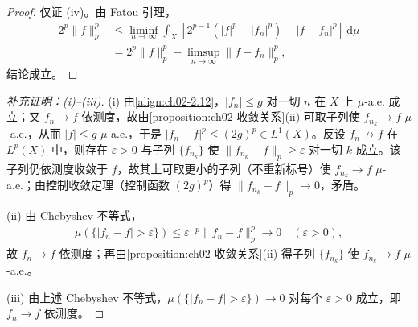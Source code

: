 \documentclass[../../main.tex]{subfiles}%
\begin{document}
\begin{proof}
仅证 (iv)。由 Fatou 引理，
\begin{align*}
2^p\|f\|_p^p&\leqslant\liminf_{n\to\infty}\int_X[2^{p-1}(|f|^p+|f_n|^p)-|f-f_n|^p]\,\mathrm{d}\mu\\
&=2^p\|f\|_p^p-\limsup_{n\to\infty}\|f-f_n\|_p^p,
\end{align*}
结论成立。
\end{proof}

\begin{proof}[补充证明：(i)--(iii)]
(i) 由\eqref{align:ch02-2.12}，$|f_n|\leqslant g$ 对一切 $n$ 在 $X$ 上 $\mu$-a.e. 成立；又 $f_n\to f$ 依测度，故由\cref{proposition:ch02-收敛关系}(ii) 可取子列使 $f_{n_k}\to f$ $\mu$-a.e.，从而 $|f|\leqslant g$ $\mu$-a.e.，于是 $|f_n-f|^p\leqslant(2g)^p\in L^1(X)$。反设 $f_n\not\to f$ 在 $L^p(X)$ 中，则存在 $\varepsilon>0$ 与子列 $\{f_{n_k}\}$ 使 $\|f_{n_k}-f\|_p\geqslant\varepsilon$ 对一切 $k$ 成立。该子列仍依测度收敛于 $f$，故其上可取更小的子列（不重新标号）使 $f_{n_k}\to f$ $\mu$-a.e.；由控制收敛定理（控制函数 $(2g)^p$）得 $\|f_{n_k}-f\|_p\to0$，矛盾。

(ii) 由 Chebyshev 不等式，
\begin{align*}
\mu(\{|f_n-f|>\varepsilon\})\leqslant\varepsilon^{-p}\|f_n-f\|_p^p\to0\quad(\varepsilon>0),
\end{align*}
故 $f_n\to f$ 依测度；再由\cref{proposition:ch02-收敛关系}(ii) 得子列 $\{f_{n_k}\}$ 使 $f_{n_k}\to f$ $\mu$-a.e.。

(iii) 由上述 Chebyshev 不等式，$\mu(\{|f_n-f|>\varepsilon\})\to0$ 对每个 $\varepsilon>0$ 成立，即 $f_n\to f$ 依测度。
\end{proof}
\end{document}
